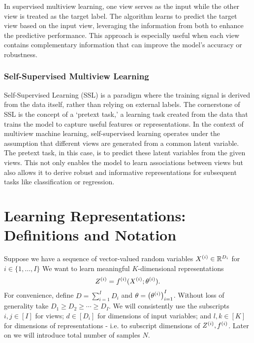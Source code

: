 In supervised multiview learning, one view serves as the input while the other view is treated as the target label. The algorithm learns to predict the target view based on the input view, leveraging the information from both to enhance the predictive performance. This approach is especially useful when each view contains complementary information that can improve the model's accuracy or robustness.

\subsubsection{Self-Supervised Multiview Learning}

Self-Supervised Learning (SSL) is a paradigm where the training signal is derived from the data itself, rather than relying on external labels. The cornerstone of SSL is the concept of a `pretext task,' a learning task created from the data that trains the model to capture useful features or representations. In the context of multiview machine learning, self-supervised learning operates under the assumption that different views are generated from a common latent variable. The pretext task, in this case, is to predict these latent variables from the given views. This not only enables the model to learn associations between views but also allows it to derive robust and informative representations for subsequent tasks like classification or regression.

\section{Learning Representations: Definitions and Notation}

Suppose we have a sequence of vector-valued random variables $X^{(i)} \in \mathbb{R}^{D_i}$ for $i \in \{1, \dots, I \}$
We want to learn meaningful $K$-dimensional representations
\begin{equation}\label{eq:general-form-of-representations}
    Z^{(i)} = f^{(i)}( X^{(i)}; \theta^{(i)}).
\end{equation}
For convenience, define $D = \sum_{i=1}^I D_i$ and $\theta = \left(\theta^{(i)}\right)_{i=1}^I$.
Without loss of generality take $D_1 \geq D_2 \geq \cdots \geq D_I$.
We will consistently use the subscripts $i,j \in [I]$ for views;
$d \in [D_i]$ for dimensions of input variables;
and $l,k \in [K]$ for dimensions of representations - i.e. to subscript dimensions of $Z^{(i)}, f^{(i)}$.
Later on we will introduce total number of samples $N$.

